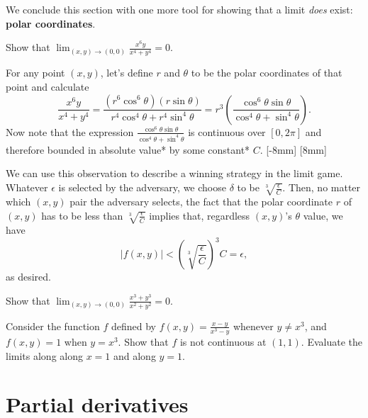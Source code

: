 \documentclass[svgnames]{report}
\begin{document}
We conclude this section with one more tool for showing that a limit
\textit{does} exist: \textbf{polar coordinates}.

\begin{example}{}{}
  Show that $\displaystyle{\lim_{(x,y) \to (0,0)}\frac{x^6 y}{x^4 + y^4} = 0}$. 
\end{example}

\begin{solution}
  For any point $(x,y)$, let's define $r$ and $\theta$ to be the polar
  coordinates of that point and calculate
  \[
    \frac{x^6 y}{x^4 + y^4} = \frac{(r^6 \cos^6 \theta) (r\sin \theta)}{r^4
      \cos^4 \theta + r^4\sin^4 \theta} = r^3 \left(\frac{\cos^6\theta \sin
      \theta}{ \cos^4 \theta + \sin^4\theta}\right). 
  \]
  Now note that the expression $\frac{\cos^6\theta \sin
      \theta}{ \cos^4 \theta + \sin^4\theta}$ is continuous over
    $[0,2\pi]$ and therefore bounded in absolute value* by some
    constant* $C$. [-8mm]
    [8mm]

    We can use this observation to describe a winning strategy in the
    limit game. Whatever $\epsilon$ is selected by the adversary, we
    choose $\delta$ to be $\sqrt[3]{\frac{\epsilon}{C}}$. Then, 
    no matter which $(x,y)$ pair the adversary selects, the fact that
    the polar coordinate $r$ of $(x,y)$ has to be less than
    $\sqrt[3]{\frac{\epsilon}{C}}$ implies that, regardless $(x,y)$'s
    $\theta$ value, we have 
    \[
      |f(x,y)| <  \left(\sqrt[3]{\frac{\epsilon}{C}}\right)^3 C =
      \epsilon, 
    \]
    as desired. 
  \end{solution}

  \begin{exercise}{}{}
    Show that $\displaystyle{\lim_{(x,y) \to (0,0)} \frac{x^3 + y^3}{x^2 + y^2}} =
    0$. 
  \end{exercise}

  \begin{exercise}{}{}
    Consider the function $f$ defined by $f(x,y) = \frac{x-y}{x^3-y}$
    whenever $y \neq x^3$, and $f(x,y) = 1$ when $y = x^3$. Show that
    $f$ is not continuous at $(1,1)$. Evaluate the limits along along
    $x=1$ and along $y=1$.
  \end{exercise}

  \section{Partial derivatives}
\end{document}
